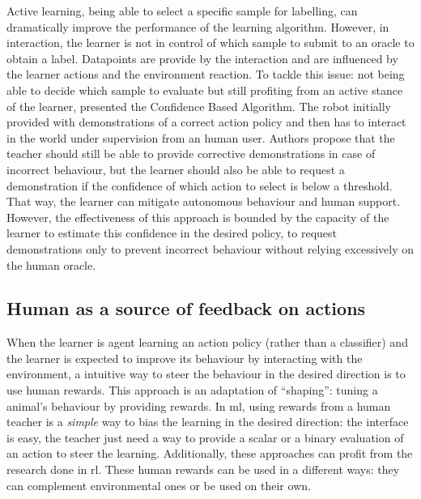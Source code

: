 Active learning, being able to select a specific sample for labelling, can dramatically improve the performance of the learning algorithm. However, in interaction, the learner is not in control of which sample to submit to an oracle to obtain a label. Datapoints are provide by the interaction and are influenced by the learner actions and the environment reaction. To tackle this issue: not being able to decide which sample to evaluate but still profiting from an active stance of the learner,  \cite{chernova2009} presented the Confidence Based Algorithm. The robot initially provided with demonstrations of a correct action policy and then has to interact in the world under supervision from an human user. Authors propose that the teacher should still be able to provide corrective demonstrations in case of incorrect behaviour, but the learner should also be able to request a demonstration if the confidence of which action to select is below a threshold. That way, the learner can mitigate autonomous behaviour and human support. However, the effectiveness of this approach is bounded by the capacity of the learner to estimate this confidence in the desired policy, to request demonstrations only to prevent incorrect behaviour without relying excessively on the human oracle.

\subsection{Human as a source of feedback on actions}

When the learner is agent learning an action policy (rather than a classifier) and the learner is expected to improve its behaviour by interacting with the environment, a intuitive way to steer the behaviour in the desired direction is to use human rewards. This approach is an adaptation of ``shaping'': tuning a animal's behaviour by providing rewards. In \gls{ml}, using rewards from a human teacher is a \textit{simple} way to bias the learning in the desired direction: the interface is easy, the teacher just need a way to provide a scalar or a binary evaluation of an action to steer the learning. Additionally, these approaches can profit from the research done in \gls{rl}. These human rewards can be used in a different ways: they can complement environmental ones \citep{knox2010combining} or be used on their own. 

